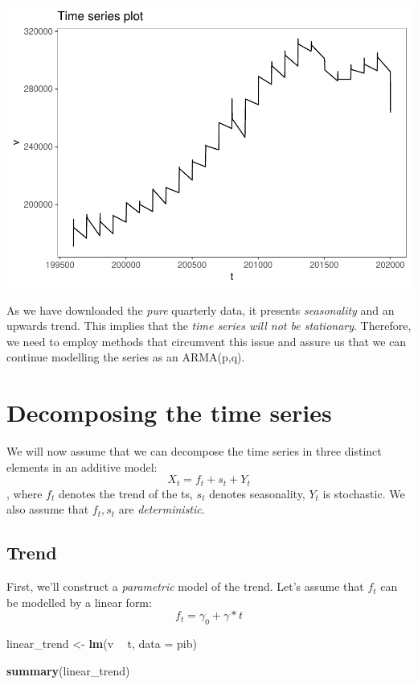 \documentclass[11pt, a4paper]{report}
\newenvironment{Shaded}{\begin{snugshade}}{\end{snugshade}}
\newcommand{\DataTypeTok}[1]{\textcolor[rgb]{0.13,0.29,0.53}{#1}}
\newcommand{\KeywordTok}[1]{\textcolor[rgb]{0.13,0.29,0.53}{\textbf{#1}}}
\newcommand{\NormalTok}[1]{#1}
\newcommand{\OperatorTok}[1]{\textcolor[rgb]{0.81,0.36,0.00}{\textbf{#1}}}
\newcommand{\StringTok}[1]{\textcolor[rgb]{0.31,0.60,0.02}{#1}}
\theoremstyle{plain}
\theoremstyle{plain}
\theoremstyle{remark}
\begin{document}
\begin{center}\includegraphics{Econo2_P5_files/figure-latex/plots-1} \end{center}

As we have downloaded the \emph{pure} quarterly data, it presents
\emph{seasonality} and an upwards trend. This implies that the
\emph{time series will not be stationary}. Therefore, we need to employ
methods that circumvent this issue and assure us that we can continue
modelling the series as an ARMA(p,q).

\section{Decomposing the time series}

We will now assume that we can decompose the time series in three
distinct elements in an additive model: \[ X_t = f_t+ s_t + Y_t \],
where \(f_t\) denotes the trend of the ts, \(s_t\) denotes
seasonality, \(Y_t\) is stochastic. We also assume that \(f_t, s_t\) are
\emph{deterministic}.

\subsection{Trend}

First, we'll construct a \emph{parametric} model of the trend. Let's
assume that \(f_t\) can be modelled by a linear form:
\[ f_t = \gamma_0 + \gamma *t \]

\begin{Shaded}
	\begin{Highlighting}[]
		\NormalTok{linear_trend <-}\StringTok{ }\KeywordTok{lm}\NormalTok{(v }\OperatorTok{~}\StringTok{ }\NormalTok{t, }\DataTypeTok{data =}\NormalTok{ pib)}
		
		\KeywordTok{summary}\NormalTok{(linear_trend)}
	\end{Highlighting}
\end{Shaded}
\end{document}
